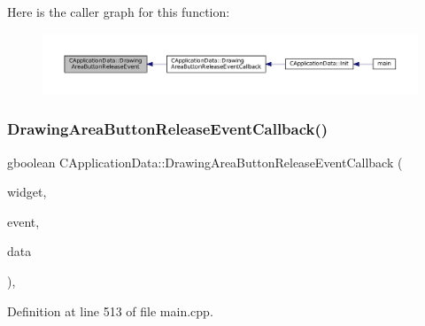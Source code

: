 Here is the caller graph for this function\+:\nopagebreak
\begin{figure}[H]
\begin{center}
\leavevmode
\includegraphics[width=350pt]{classCApplicationData_a7df4d71ef6fabf7eac740c95cfe3cd81_icgraph}
\end{center}
\end{figure}
\hypertarget{classCApplicationData_a2708d2083c8c2e7c8de126b40eb17b3f}{}\label{classCApplicationData_a2708d2083c8c2e7c8de126b40eb17b3f} 
\subsubsection{\texorpdfstring{Drawing\+Area\+Button\+Release\+Event\+Callback()}{DrawingAreaButtonReleaseEventCallback()}}
{\footnotesize\ttfamily gboolean C\+Application\+Data\+::\+Drawing\+Area\+Button\+Release\+Event\+Callback (\begin{DoxyParamCaption}\item[{Gtk\+Widget $\ast$}]{widget,  }\item[{Gdk\+Event\+Button $\ast$}]{event,  }\item[{gpointer}]{data }\end{DoxyParamCaption})\hspace{0.3cm}{\ttfamily [static]}, {\ttfamily [protected]}}



Definition at line 513 of file main.\+cpp.


